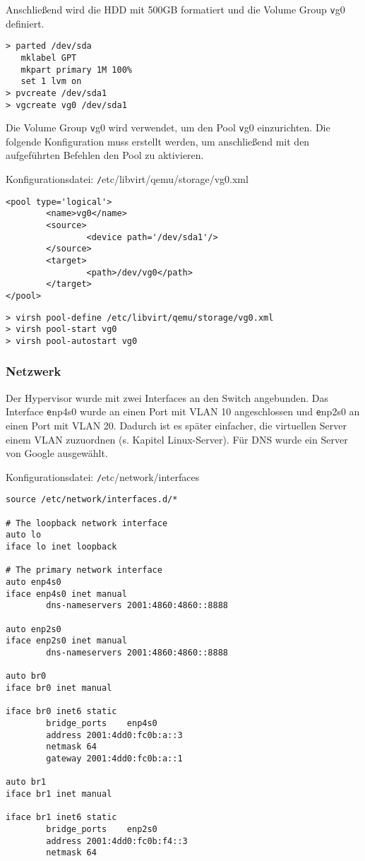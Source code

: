 Anschließend wird die HDD mit 500GB formatiert und die Volume Group {\texttt vg0} definiert.\newline

\begin{lstlisting}[numbers=none]
> parted /dev/sda
   mklabel GPT
   mkpart primary 1M 100%
   set 1 lvm on
> pvcreate /dev/sda1
> vgcreate vg0 /dev/sda1
\end{lstlisting} 

Die Volume Group {\texttt vg0} wird verwendet, um den Pool {\texttt vg0} einzurichten. Die folgende Konfiguration muss erstellt werden, um anschließend mit den aufgeführten Befehlen den Pool zu aktivieren.

\newpage
Konfigurationsdatei: {\texttt /etc/libvirt/qemu/storage/vg0.xml}
\begin{lstlisting}
<pool type='logical'>
        <name>vg0</name>
        <source>
                <device path='/dev/sda1'/>
        </source>
        <target>
                <path>/dev/vg0</path>
        </target>
</pool>
\end{lstlisting}
\begin{lstlisting}[numbers=none]
> virsh pool-define /etc/libvirt/qemu/storage/vg0.xml
> virsh pool-start vg0
> virsh pool-autostart vg0
\end{lstlisting}

\subsubsection{Netzwerk}

Der Hypervisor wurde mit zwei Interfaces an den Switch angebunden. Das Interface {\texttt enp4s0} wurde an einen Port mit VLAN 10 angeschlossen und {\texttt enp2s0} an einen Port mit VLAN 20. Dadurch ist es später einfacher, die virtuellen Server einem VLAN zuzuordnen (s. Kapitel \ql Linux-Server\qr). Für DNS wurde ein Server von Google ausgewählt.\newline

Konfigurationsdatei: {\texttt /etc/network/interfaces}
\begin{lstlisting}
source /etc/network/interfaces.d/*

# The loopback network interface
auto lo
iface lo inet loopback

# The primary network interface
auto enp4s0
iface enp4s0 inet manual
        dns-nameservers 2001:4860:4860::8888

auto enp2s0
iface enp2s0 inet manual
        dns-nameservers 2001:4860:4860::8888

auto br0
iface br0 inet manual

iface br0 inet6 static
        bridge_ports    enp4s0
        address 2001:4dd0:fc0b:a::3
        netmask 64
        gateway 2001:4dd0:fc0b:a::1

auto br1
iface br1 inet manual

iface br1 inet6 static
        bridge_ports    enp2s0
        address 2001:4dd0:fc0b:f4::3
        netmask 64
\end{lstlisting}
